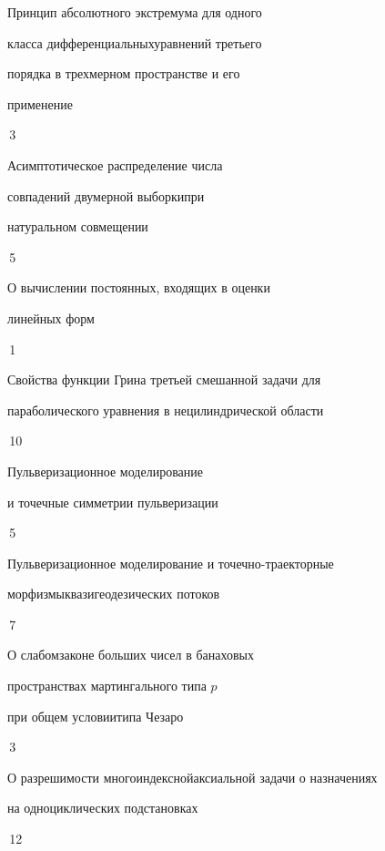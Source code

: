 

{Принцип абсолютного экстремума для одного 


класса дифференциальных\newline уравнений третьего 


порядка в трехмерном пространстве и его 


применение}{\No\,3}




{Асимптотическое распределение числа


совпадений двумерной выборки\newline при


натуральном совмещении}{\No\,5}




{О вычислении постоянных, входящих в оценки  


линейных форм}{\No\,1}




{Свойства функции Грина третьей смешанной задачи для\newline


параболического уравнения в нецилиндрической области}{\No\,10}




{Пульверизационное моделирование


и точечные симметрии пульверизации}{\No\,5}




{Пульверизационное моделирование и точечно-траекторные 


морфизмы\newline квазигеодезических потоков}{\No\,7}




{О слабом\newline законе больших чисел в банаховых


пространствах мартингального типа $p$ 


при общем условии\newline типа Чезаро}{\No\,3}




{О разрешимости многоиндексной\newline аксиальной задачи о назначениях


на одноциклических подстановках}{\No\,12}


